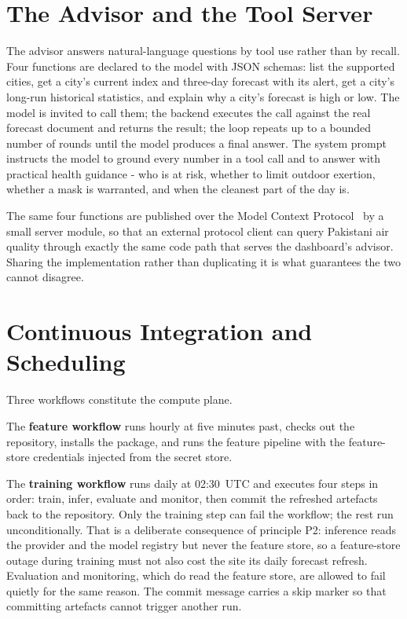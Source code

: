 \section{The Advisor and the Tool Server}
The advisor answers natural-language questions by tool use rather than by recall.
Four functions are declared to the model with JSON schemas: list the supported
cities, get a city's current index and three-day forecast with its alert, get a
city's long-run historical statistics, and explain why a city's forecast is high
or low. The model is invited to call them; the backend executes the call against
the real forecast document and returns the result; the loop repeats up to a
bounded number of rounds until the model produces a final answer. The system
prompt instructs the model to ground every number in a tool call and to answer
with practical health guidance - who is at risk, whether to limit outdoor
exertion, whether a mask is warranted, and when the cleanest part of the day is.

The same four functions are published over the Model Context
Protocol~\cite{ref:mcp} by a small server module, so that an external protocol
client can query Pakistani air quality through exactly the same code path that
serves the dashboard's advisor. Sharing the implementation rather than duplicating
it is what guarantees the two cannot disagree.

\section{Continuous Integration and Scheduling}
\label{sec:impl-cicd}
Three workflows constitute the compute plane.

The \textbf{feature workflow} runs hourly at five minutes past, checks out the
repository, installs the package, and runs the feature pipeline with the
feature-store credentials injected from the secret store.

The \textbf{training workflow} runs daily at 02:30~UTC and executes four steps in
order: train, infer, evaluate and monitor, then commit the refreshed artefacts
back to the repository. Only the training step can fail the workflow; the rest
run unconditionally. That is a deliberate consequence of principle P2: inference
reads the provider and the model registry but never the feature store, so a
feature-store outage during training must not also cost the site its daily
forecast refresh. Evaluation and monitoring, which do read the feature store, are
allowed to fail quietly for the same reason. The commit message carries a skip marker so that committing artefacts
cannot trigger another run.

